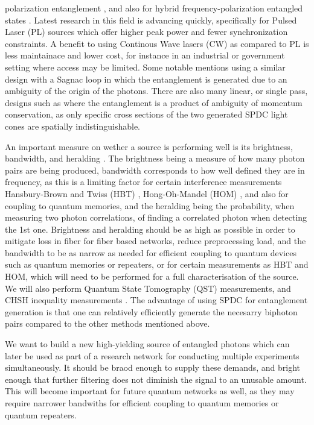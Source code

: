 \documentclass{article}
\theoremstyle{mytheoremstyle}
\theoremstyle{mytheoremstyle}
\theoremstyle{myproblemstyle}
\begin{document}
polarization entanglement \cite{L_Z_F_F_L_L_W_R_D_X_etal._2017}, and also for hybrid frequency-polarization
entangled states \cite{F_R_D_F_L_M_A_B_D_2023}. Latest research in this field is advancing quickly, specifically for
Pulsed Laser (PL) sources which offer higher peak power and fewer synchronization constraints.
A benefit to using Continous Wave lasers (CW) as compared to PL is less maintainace and lower cost, for instance in an industrial or government
setting where access may be limited. Some notable mentions using a similar design with a Sagnac loop
\cite{Neumann_Buchner_Bulla_Bohmann_Ursin_2022_CW,Chen_Ecker_Wengerowsky_Bulla_Joshi_Steinlechner_Ursin_2018_CW}
in which the entanglement is generated due to an ambiguity of the origin of the photons.
There are also many linear, or single pass, designs such as \cite{Lee_Kim_Cha_Moon_2016,Kwiat_Mattle_Weinfurter_Zeilinger_Sergienko_Shih_1995}
where the entanglement is a product of ambiguity of momentum conservation, as only specific cross sections of the two generated SPDC light
cones are spatially indistinguishable.
\par An important measure on wether a source is performing well is its brightness, bandwidth, and heralding \cite{Bennink_2010,Ljunggren_Tengner_Marsden_Pelton_2006}.
The brightness being a measure of how many photon pairs are being produced, bandwidth corresponds to how well defined they are in frequency,
as this is a limiting factor for certain interference measurements Hansbury-Brown and Twiss (HBT) \cite{Brown_Twiss_1954},
Hong-Oh-Mandel (HOM) \cite{Hong_Ou_Mandel_1987}, and also for coupling to quantum memories,
and the heralding being the probability, when measuring two photon correlations, of finding a correlated photon when detecting the 1st one.
Brightness and heralding should be as high as possible in order to mitigate loss in fiber for fiber based networks,
reduce preprocessing load, and the bandwidth to be as narrow as needed for efficient coupling to quantum devices such as quantum memories or repeaters,
or for certain measurements as HBT and HOM, which will need to be performed for a full characterisation of the source.
We will also perform Quantum State Tomography (QST) measurements, and CHSH inequality measurements \cite{Clauser_Horne_Shimony_Holt_1969}.
The advantage of using SPDC for entanglement generation is that one can relatively efficiently generate the necesarry biphoton pairs
compared to the other methods mentioned above.

We want to build a new high-yielding source of entangled photons which can later be used as part of a research network
for conducting multiple experiments simultaneously. It should be braod enough to supply these demands, and bright enough
that further filtering does not diminish the signal to an unusable amount. This will become important for future quantum
networks as well, as they may require narrower bandwiths for efficient coupling to quantum memories or quantum repeaters.
\end{document}
